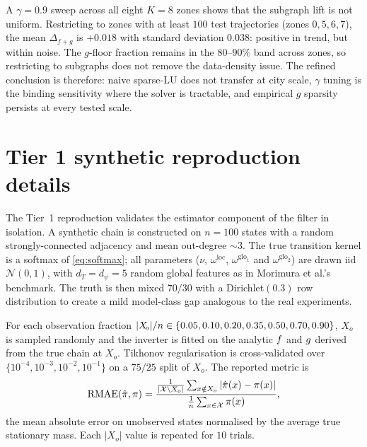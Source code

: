 A $\gamma=0.9$ sweep across all eight $K=8$ zones shows that the subgraph
lift is not uniform. Restricting to zones with at least $100$ test
trajectories (zones $0,5,6,7$), the mean $\Delta_{f+g}$ is $+0.018$ with
standard deviation $0.038$: positive in trend, but within noise. The
$g$-floor fraction remains in the $80$--$90\%$ band across zones, so
restricting to subgraphs does not remove the data-density issue. The
refined conclusion is therefore: naive sparse-LU does not transfer at city
scale, $\gamma$ tuning is the binding sensitivity where the solver is
tractable, and empirical $g$ sparsity persists at every tested scale.

\section{Tier 1 synthetic reproduction details}
\label{app:phase1-synthetic-details}

The Tier~1 reproduction validates the estimator component of the filter in
isolation. A synthetic chain is constructed on $n=100$ states with a random
strongly-connected adjacency and mean out-degree $\sim 3$. The true
transition kernel is a softmax of \cref{eq:softmax}; all parameters
($\nu$, $\omega^{\mathrm{loc}}$, $\omega^{\mathrm{glo}_1}$ and
$\omega^{\mathrm{glo}_2}$) are drawn iid $\mathcal{N}(0,1)$, with
$d_T=d_\psi=5$ random global features as in Morimura et al.'s benchmark.
The truth is then mixed $70/30$ with a Dirichlet$(0.3)$ row distribution to
create a mild model-class gap analogous to the real experiments.

For each observation fraction $|X_{\!o}|/n \in \{0.05,0.10,0.20,0.35,0.50,
0.70,0.90\}$, $X_o$ is sampled randomly and the inverter is fitted on the
analytic $f$ and $g$ derived from the true chain at $X_o$.
Tikhonov regularisation is cross-validated over
$\{10^{-4},10^{-3},10^{-2},10^{-1}\}$ on a $75/25$ split of $X_o$. The
reported metric is
\begin{equation}
\mathrm{RMAE}(\hat{\pi}, \pi) =
\frac{\frac{1}{|\mathcal{X}\setminus X_o|}\sum_{x\notin X_o}
|\hat{\pi}(x)-\pi(x)|}
{\frac{1}{n}\sum_{x\in\mathcal{X}}\pi(x)} ,
\end{equation}
the mean absolute error on unobserved states normalised by the average true
stationary mass. Each $|X_o|$ value is repeated for $10$ trials.

